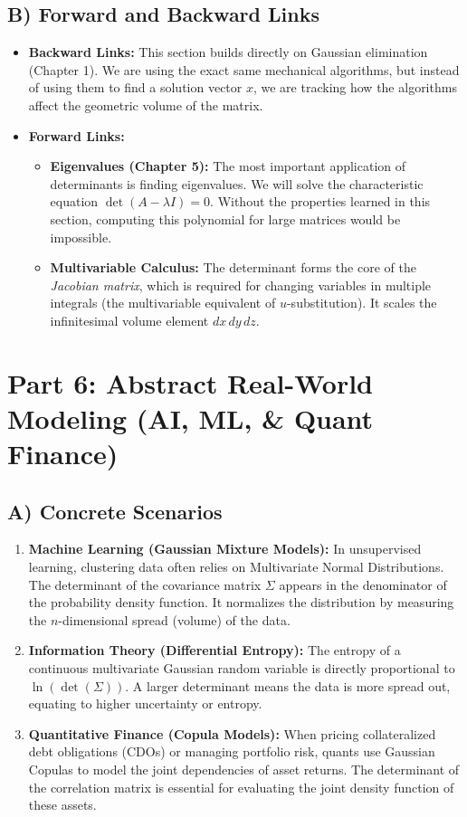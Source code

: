 \documentclass{article}
\begin{document}
\subsection{B) Forward and Backward Links}
\begin{itemize}
    \item \textbf{Backward Links:} This section builds directly on Gaussian elimination (Chapter 1). We are using the exact same mechanical algorithms, but instead of using them to find a solution vector $x$, we are tracking how the algorithms affect the geometric volume of the matrix.
    \item \textbf{Forward Links:} 
    \begin{itemize}
        \item \textbf{Eigenvalues (Chapter 5):} The most important application of determinants is finding eigenvalues. We will solve the characteristic equation $\det(A - \lambda I) = 0$. Without the properties learned in this section, computing this polynomial for large matrices would be impossible.
        \item \textbf{Multivariable Calculus:} The determinant forms the core of the \textit{Jacobian matrix}, which is required for changing variables in multiple integrals (the multivariable equivalent of $u$-substitution). It scales the infinitesimal volume element $dx \, dy \, dz$.
    \end{itemize}
\end{itemize}

\newpage
\section{Part 6: Abstract Real-World Modeling (AI, ML, \& Quant Finance)}

\subsection{A) Concrete Scenarios}
\begin{enumerate}
    \item \textbf{Machine Learning (Gaussian Mixture Models):} In unsupervised learning, clustering data often relies on Multivariate Normal Distributions. The determinant of the covariance matrix $\Sigma$ appears in the denominator of the probability density function. It normalizes the distribution by measuring the $n$-dimensional spread (volume) of the data.
    \item \textbf{Information Theory (Differential Entropy):} The entropy of a continuous multivariate Gaussian random variable is directly proportional to $\ln(\det(\Sigma))$. A larger determinant means the data is more spread out, equating to higher uncertainty or entropy.
    \item \textbf{Quantitative Finance (Copula Models):} When pricing collateralized debt obligations (CDOs) or managing portfolio risk, quants use Gaussian Copulas to model the joint dependencies of asset returns. The determinant of the correlation matrix is essential for evaluating the joint density function of these assets.
\end{enumerate}
\end{document}
